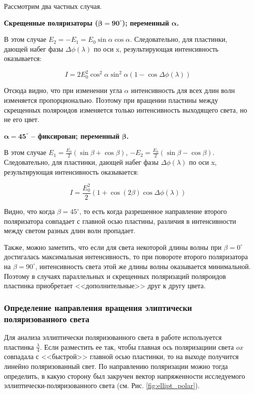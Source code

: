 \documentclass[a4paper,12pt]{article} %
\begin{document}
Рассмотрим два частных случая.

\textbf{Скрещенные поляризаторы ($\bm{\beta = 90^\circ}$); переменный $\bm{\alpha}$.}

В этом случае $E_2 = -E_1 = E_0 \sin\alpha \cos\alpha$. Следовательно, для пластинки, дающей набег фазы $\Delta\phi(\lambda)$ по оси x, результирующая интенсивность оказывается:

\begin{equation}
    I = 2E_0^2 \cos^2\alpha \sin^2\alpha (1 - \cos\Delta\phi(\lambda))
\end{equation}

Отсюда видно, что при изменении угла $\alpha$ интенсивность для всех длин волн изменяется пропорционально. Поэтому при вращении пластины между скрещенных поляроидов изменяется только интенсивность выходящего света, но не его цвет.

\textbf{$\bm{\alpha = 45^\circ}$ -- фиксирован; переменный $\bm{\beta}$.}


В этом случае $E_1 = \frac{E_0}{2}(\sin\beta + \cos\beta)$, $-E_2 = \frac{E_0}{2}(\sin\beta - \cos\beta)$. Следовательно, для пластинки, дающей набег фазы $\Delta\phi(\lambda)$ по оси x, результирующая интенсивность оказывается:

\begin{equation}
    I = \frac{E_0^2}{2}(1 + \cos(2\beta)\cos\Delta\phi(\lambda))
\end{equation}

Видно, что когда $\beta = 45^\circ$, то есть когда разрешенное направление второго поляризатора совпадает с главной осью пластины, различия в интенсивности между светом разных длин волн пропадает.

Также, можно заметить, что если для света некоторой длины волны при $\beta = 0^\circ$ достигалась максимальная интенсивность, то при повороте второго поляризатора на $\beta = 90^\circ$, интенсивность света этой же длины волны оказывается минимальной. Поэтому в случаях параллельных и скрещенных поляризаций поляроидов пластинка приобретает <<дополнительные>> друг к другу цвета.

\subsubsection{Определение направления вращения элиптически поляризованного света}

Для анализа эллиптически поляризованного света в работе используется пластинка $\frac{\lambda}{4}$. Если разместить ее так, чтобы главная ось поляризациии света $ox$ совпадала с <<быстрой>> главной осью пластинки, то на выходе получится линейно поляризованный свет. По направлению поляризации можно тогда определить, в какую сторону был закручен вектор напряженности исследуемого эллиптически-поляризованного света (см. Рис. \ref{fig:ellipt_polar}).
\end{document}
